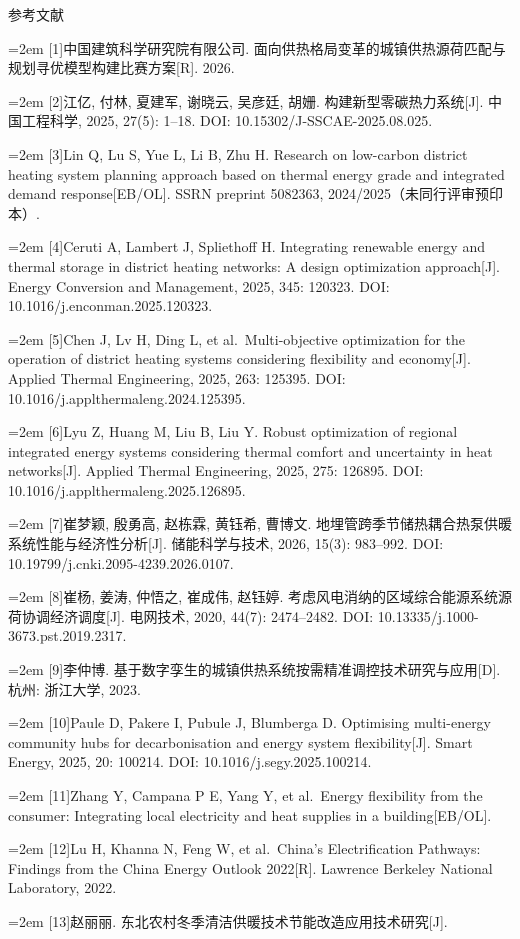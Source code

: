 \documentclass[12pt,a4paper]{article}
\newcommand{\heiti}{\headingfont}
\newcommand{\sihao}{\fontsize{14pt}{14pt}\selectfont}
\newenvironment{refsectionflush}
  {\par\sloppy\setlength{\parindent}{0pt}\setlength{\parskip}{0pt}}
  {\par\fussy}
\newcommand{\refentry}[2]{%
  \par\noindent\hangindent=2em\hangafter=1
  [#1]\enspace #2\par}
\begin{document}
\clearpage
\begin{center}{\heiti\sihao 参考文献}\end{center}
{}
\begin{refsectionflush}
\refentry{1}{中国建筑科学研究院有限公司.
面向供热格局变革的城镇供热源荷匹配与规划寻优模型构建比赛方案{[}R{]}.
2026.}
\refentry{2}{江亿, 付林, 夏建军, 谢晓云, 吴彦廷, 胡姗.
构建新型零碳热力系统{[}J{]}. 中国工程科学, 2025, 27(5): 1--18. DOI:
10.15302/J-SSCAE-2025.08.025.}
\refentry{3}{Lin Q, Lu S, Yue L, Li B, Zhu H. Research on low-carbon district
heating system planning approach based on thermal energy grade and
integrated demand response{[}EB/OL{]}. SSRN preprint 5082363,
2024/2025（未同行评审预印本）.}
\refentry{4}{Ceruti A, Lambert J, Spliethoff H. Integrating renewable energy
and thermal storage in district heating networks: A design optimization
approach{[}J{]}. Energy Conversion and Management, 2025, 345: 120323.
DOI: 10.1016/j.enconman.2025.120323.}
\refentry{5}{Chen J, Lv H, Ding L, et al.~Multi-objective optimization for
the operation of district heating systems considering flexibility and
economy{[}J{]}. Applied Thermal Engineering, 2025, 263: 125395. DOI:
10.1016/j.applthermaleng.2024.125395.}
\refentry{6}{Lyu Z, Huang M, Liu B, Liu Y. Robust optimization of regional
integrated energy systems considering thermal comfort and uncertainty in
heat networks{[}J{]}. Applied Thermal Engineering, 2025, 275: 126895.
DOI: 10.1016/j.applthermaleng.2025.126895.}
\refentry{7}{崔梦颖, 殷勇高, 赵栋霖, 黄钰希, 曹博文.
地埋管跨季节储热耦合热泵供暖系统性能与经济性分析{[}J{]}. 储能科学与技术,
2026, 15(3): 983--992. DOI: 10.19799/j.cnki.2095-4239.2026.0107.}
\refentry{8}{崔杨, 姜涛, 仲悟之, 崔成伟, 赵钰婷.
考虑风电消纳的区域综合能源系统源荷协调经济调度{[}J{]}. 电网技术, 2020,
44(7): 2474--2482. DOI: 10.13335/j.1000-3673.pst.2019.2317.}
\refentry{9}{李仲博.
基于数字孪生的城镇供热系统按需精准调控技术研究与应用{[}D{]}. 杭州:
浙江大学, 2023.}
\refentry{10}{Paule D, Pakere I, Pubule J, Blumberga D. Optimising
multi-energy community hubs for decarbonisation and energy system
flexibility{[}J{]}. Smart Energy, 2025, 20: 100214. DOI:
10.1016/j.segy.2025.100214.}
\refentry{11}{Zhang Y, Campana P E, Yang Y, et al.~Energy flexibility from
the consumer: Integrating local electricity and heat supplies in a
building{[}EB/OL{]}.}
\refentry{12}{Lu H, Khanna N, Feng W, et al.~China's Electrification
Pathways: Findings from the China Energy Outlook 2022{[}R{]}. Lawrence
Berkeley National Laboratory, 2022.}
\refentry{13}{赵丽丽. 东北农村冬季清洁供暖技术节能改造应用技术研究{[}J{]}.
}
\end{refsectionflush}
\end{document}
